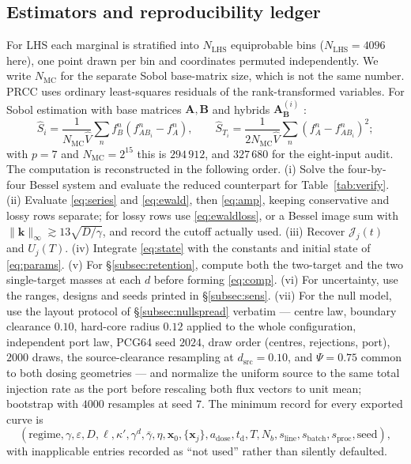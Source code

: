\documentclass[pdflatex,sn-mathphys-num]{sn-jnl}
\numberwithin{equation}{section}
\theoremstyle{thmstyleone}%
\theoremstyle{definition}
\theoremstyle{remark}
\begin{document}
\begin{appendices}
\section{Estimators and reproducibility ledger}
\label{app:mc}
For LHS each marginal is stratified into $N_{\mathrm{LHS}}$ equiprobable bins
($N_{\mathrm{LHS}}=4096$ here), one point drawn per bin and coordinates permuted
independently. We write $N_{\mathrm{MC}}$ for the separate Sobol base-matrix
size, which is not the same number. PRCC uses ordinary least-squares
residuals of the rank-transformed variables. For Sobol estimation with base
matrices $\mathbf A,\mathbf B$ and hybrids $\mathbf A^{(i)}_{\mathbf B}$ \cite{saltelli2010variance,jansen1999analysis}:
\[
\widehat S_i=\frac{1}{N_{\mathrm{MC}}\widehat V}\sum_n f^n_B(f^n_{AB_i}-f^n_A),
\qquad
\widehat S_{T_i}=\frac{1}{2N_{\mathrm{MC}}\widehat V}\sum_n(f^n_A-f^n_{AB_i})^2;
\]
with $p=7$ and $N_{\mathrm{MC}}=2^{15}$ this is $294\,912$, and $327\,680$ for
the eight-input audit.
The computation is reconstructed in the following order. (i) Solve the
four-by-four Bessel system and evaluate the reduced counterpart for
Table~\ref{tab:verify}. (ii) Evaluate \eqref{eq:series} and \eqref{eq:ewald},
then \eqref{eq:amp}, keeping conservative and lossy rows separate; for lossy
rows use \eqref{eq:ewaldloss}, or a Bessel image sum with
$\|\mathbf k\|_\infty\gtrsim13\sqrt{D/\gamma}$, and record the cutoff actually
used. (iii) Recover $\mathcal J_j(t)$ and $U_j(T)$. (iv) Integrate \eqref{eq:state} with the
constants and initial state of \eqref{eq:params}. (v) For \S\ref{subsec:retention}, compute both the two-target and the two single-target masses at each $d$ before forming \eqref{eq:comp}. (vi) For
uncertainty, use the ranges, designs and seeds printed in
\S\ref{subsec:sens}. (vii) For the null model, use the layout protocol of
\S\ref{subsec:nullspread} verbatim --- centre law, boundary clearance $0.10$,
hard-core radius $0.12$ applied to the whole configuration, independent port law,
PCG64 seed $2024$, draw order (centres, rejections, port), $2000$ draws, the source-clearance resampling at $d_{\mathrm{src}}=0.10$, and $\Psi=0.75$ common to both dosing
geometries --- and normalize the uniform source to the same total injection rate
as the port before rescaling both flux vectors to unit mean; bootstrap with
$4000$ resamples at seed $7$. The minimum record for every exported curve is
\[
(\text{regime},\gamma,\varepsilon,D,\ell,\kappa',\gamma^d,\bar\gamma,\eta,
\mathbf x_0,\{\mathbf x_j\},a_{\mathrm{dose}},t_{\mathrm d},T,N_b,
s_{\mathrm{line}},s_{\mathrm{batch}},s_{\mathrm{proc}},\text{seed}),
\]
with inapplicable entries recorded as ``not used'' rather than silently
defaulted.


\end{appendices}
\end{document}
